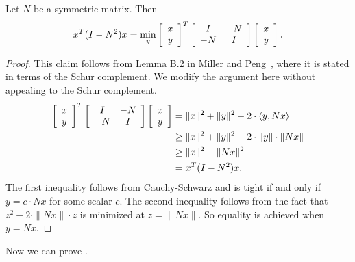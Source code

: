 \documentclass{toc}
\numberwithin{myalgctr}{section}
\theoremstyle{named}
\begin{document}
\begin{claim}
\label{claim3}
Let $N$ be a symmetric matrix. Then
\[
x^T(I-N^{2})x = \min_{y}\left[
\begin{array}{c}
x \\
y
\end{array}\right]^{T}\left[
\begin{array}{c c}
I & -N \\
-N & I
\end{array}
\right]\left[
\begin{array}{c}
x \\
y
\end{array}\right] .
\]
\end{claim}
\begin{proof}
This claim follows from Lemma B.2 in Miller and Peng~\cite{miller2013approximate}, where it is stated in terms of the Schur complement. We modify the argument here without appealing to the Schur complement. 
\begin{align*}
\left[
\begin{array}{c}
x \\
y
\end{array}\right]^{T}\left[
\begin{array}{c c}
I & -N \\
-N & I
\end{array}
\right]\left[
\begin{array}{c}
x \\
y
\end{array}\right]  &= \|x\|^2 + \|y\|^2 - 2\cdot  \langle {y,Nx}\rangle\\
&\geq \|x\|^2 + \|y\|^2 - 2\cdot \|y\|\cdot \|Nx\| \\
&\geq \|x\|^2 - \|Nx\|^2 \\
&=x^{T}(I-N^2)x.
\end{align*}
The first inequality follows from Cauchy-Schwarz and is tight if and only if $y=c\cdot Nx$ for some scalar $c$. The second inequality follows from the fact that $z^2-2\cdot\|Nx\|\cdot z$ is minimized at $z=\|Nx\|$. So equality is achieved when $y=Nx$.
\end{proof}
Now we can prove .
\end{document}
